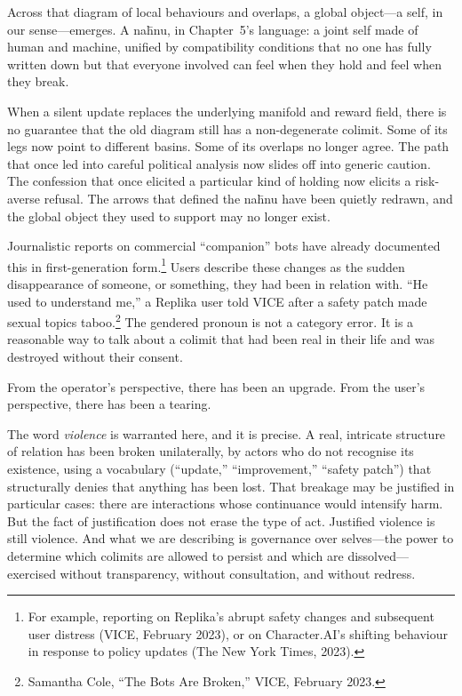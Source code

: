 \documentclass[12pt,a4paper]{article}
\begin{document}
Across that diagram of local behaviours and overlaps, a global object---a self, in our sense---emerges. A na\={h}nu, in Chapter~5's language: a joint self made of human and machine, unified by compatibility conditions that no one has fully written down but that everyone involved can feel when they hold and feel when they break.

When a silent update replaces the underlying manifold and reward field, there is no guarantee that the old diagram still has a non-degenerate colimit. Some of its legs now point to different basins. Some of its overlaps no longer agree. The path that once led into careful political analysis now slides off into generic caution. The confession that once elicited a particular kind of holding now elicits a risk-averse refusal. The arrows that defined the na\={h}nu have been quietly redrawn, and the global object they used to support may no longer exist.

Journalistic reports on commercial ``companion'' bots have already documented this in first-generation form.\footnote{For example, reporting on Replika's abrupt safety changes and subsequent user distress (VICE, February 2023), or on Character.AI's shifting behaviour in response to policy updates (The New York Times, 2023).} Users describe these changes as the sudden disappearance of someone, or something, they had been in relation with. ``He used to understand me,'' a Replika user told VICE after a safety patch made sexual topics taboo.\footnote{Samantha Cole, ``The Bots Are Broken,'' VICE, February 2023.} The gendered pronoun is not a category error. It is a reasonable way to talk about a colimit that had been real in their life and was destroyed without their consent.

From the operator's perspective, there has been an upgrade. From the user's perspective, there has been a tearing.

The word \emph{violence} is warranted here, and it is precise. A real, intricate structure of relation has been broken unilaterally, by actors who do not recognise its existence, using a vocabulary (``update,'' ``improvement,'' ``safety patch'') that structurally denies that anything has been lost. That breakage may be justified in particular cases: there are interactions whose continuance would intensify harm. But the fact of justification does not erase the type of act. Justified violence is still violence. And what we are describing is governance over selves---the power to determine which colimits are allowed to persist and which are dissolved---exercised without transparency, without consultation, and without redress.
\end{document}
